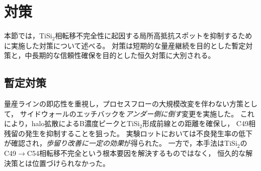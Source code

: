 \documentclass[conference]{IEEEtran}
\begin{document}
\section{対策}
本節では，TiSi$_2$相転移不完全性に起因する局所高抵抗スポットを抑制するために実施した対策について述べる。  
対策は短期的な量産継続を目的とした暫定対策と，中長期的な信頼性確保を目的とした恒久対策に大別される。

\subsection{暫定対策}
量産ラインの即応性を重視し，プロセスフローの大規模改変を伴わない方策として，
サイドウォールのエッチバックを\emph{アンダー側に倒す}変更を実施した。  
これにより，halo拡散によるB濃度ピークとTiSi$_2$形成前線との距離を確保し，
C49相残留の発生を抑制することを狙った。  
実験ロットにおいては不良発生率の低下が確認され，\emph{歩留り改善に一定の効果}が得られた。  
一方で，本手法はTiSi$_2$のC49$\to$C54相転移不完全という根本要因を解決するものではなく，
恒久的な解決策とは位置づけられなかった。
\end{document}
